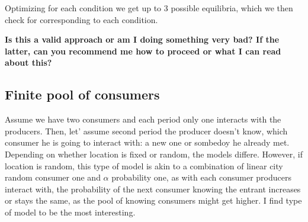 \documentclass{article}
\begin{document}
Optimizing for each condition we get up to 3 possible equilibria, which we then check for corresponding to each condition.

\textbf{Is this a valid approach or am I doing something very bad? If the latter, can you recommend me how to proceed or what I can read about this?}


\subsection{Finite pool of consumers}
Assume we have two consumers and each period only one interacts with the producers. Then, let' assume second period the producer doesn't know, which consumer he is going to interact with: a new one or sombedoy he already met. Depending on whether location is fixed or random, the models differe. However, if location is random, this type of model is akin to a combination of linear city random consumer one and $\alpha$ probability one, as with each consumer producers interact with, the probability of the next consumer knowing the entrant increases or stays the same, as the pool of knowing consumers might get higher. I find type of model to be the most interesting.







%
    
\end{document}
